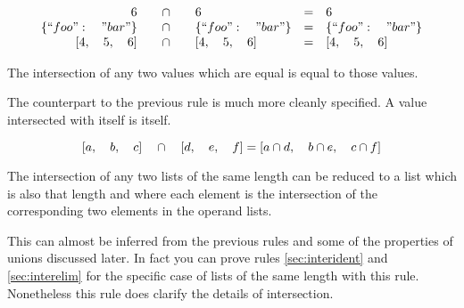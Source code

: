 \documentclass[letterpaper]{article}
\begin{document}
\begin{prule}
\label{sec:interident}
\begin{equation}
\begin{array}{rclcl}
6 \quad&\cap&\quad 6 & = & 6 \\
\{``foo":\quad"bar"\} \quad&\cap&\quad \{``foo":\quad"bar"\}  & = & \{``foo":\quad"bar"\} \\
{[}4,\quad5,\quad6] \quad&\cap&\quad {[}4,\quad5,\quad6] & = & {[}4,\quad5,\quad6] \\
\end{array}
\end{equation}

The intersection of any two values which are equal is equal to those values.
\end{prule}

The counterpart to the previous rule is much more cleanly specified. A value
intersected with itself is itself.

\begin{prule}
\begin{equation}
{[}a,\quad b,\quad c] \quad\cap\quad {[}d,\quad e,\quad f]  =  {[}a\cap d,\quad
b\cap e,\quad c\cap f] \\
\end{equation}

The intersection of any two lists of the same length can be reduced to a list
which is also that length and where each element is the intersection of the
corresponding two elements in the operand lists.
\end{prule}

This can almost be inferred from the previous rules and some of the properties
of unions discussed later. In fact you can prove rules \ref{sec:interident} and
\ref{sec:interelim} for the specific case of lists of the same length with this
rule. Nonetheless this rule does clarify the details of intersection.
\end{document}
